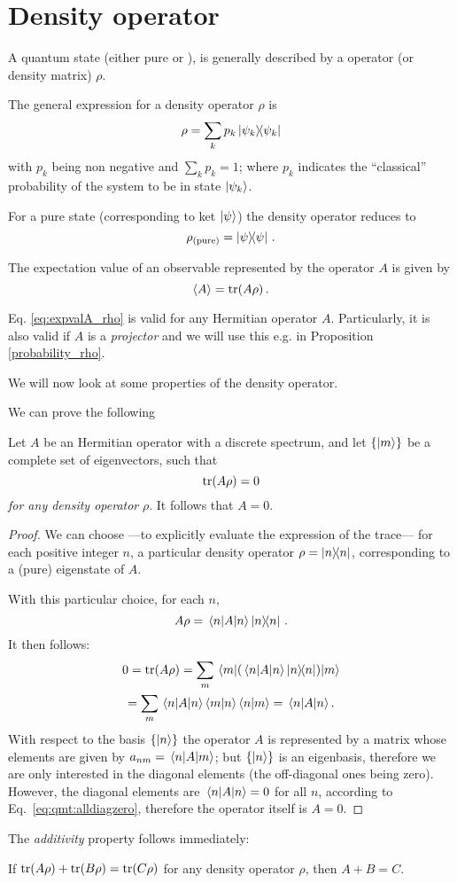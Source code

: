 \section{Density operator}\label{app:density}

A quantum state (either pure or ),
is generally described by a  operator (or density matrix) $\rho$.

The general expression for a density operator $\rho$ is
$$
  \rho = \sum_{k}p_{k}\ketbra{\psi_{k}}
$$
with $p_{k}$ being non negative and $\sum_{k}p_{k} = 1$;
where $p_k$ indicates the ``classical'' probability of the system to be in state $\ket{\psi_{k}}$.

For a pure state (corresponding to ket $\ket{\psi}$) the density operator reduces to
\[
  \rho_{(\text{pure})} = \ketbra{\psi}\,\text{.}
\]

The expectation value of an observable represented by the operator $A$
is given by \parencite{BlumDensity, FanoDensity}
\begin{equation}\label{eq:expvalA_rho}
  \expval{A} = \tr(A\rho)\,.
\end{equation}

Eq. \eqref{eq:expvalA_rho} is valid for any Hermitian operator $A$. Particularly,
it is also valid if $A$ is a \emph{projector} and we will use this
e.g. in Proposition \ref{probability_rho}.

We will now look at some properties of the density operator.

We can prove the following
\begin{proposition}
  Let $A$ be an Hermitian operator
  with a discrete spectrum,
  and let $\{\ket{m}\}$ be
  a complete set of eigenvectors,
  such that
  $$
    \tr(A\rho) = 0
  $$
  \emph{for any density operator} $\rho$.
  It follows that $A = 0$.

  \begin{proof}
    We can choose
    ---to explicitly evaluate the expression of the trace---
    for each positive integer $n$,
    a particular density operator $\rho = \ketbra{n}$,
    corresponding to a (pure) eigenstate of $A$.

    With this particular choice,
    for each $n$,
    $$
      A\rho = \mel{n}{A}{n}\ketbra{n}\,.
    $$
    It then follows:
    \begin{multline}\label{eq:qmt:alldiagzero}
      0 = \tr(A\rho) =  \sum_{m}  \mel{m}{ ( \mel{n}{A}{n}\ketbra{n} ) }{m} \\
        =               \sum_{m}  \mel{n}{A}{n} \braket{m}{n} \braket{n}{m}
        = \mel{n}{A}{n} .
    \end{multline}
    With respect to the basis $\left\{\ket{n}\right\}$ the operator $A$ is
    represented by a matrix whose elements are given by $a_{nm} = \mel{n}{A}{m}$;
    but $\left\{\ket{n}\right\}$ is an eigenbasis, therefore we are only interested in the diagonal
    elements (the off-diagonal ones being zero).
    However, the diagonal elements are  $\mel{n}{A}{n} = 0$
    for all $n$, according to Eq.~\eqref{eq:qmt:alldiagzero}, therefore the operator itself is $A=0$.
  \end{proof}
\end{proposition}

The \emph{additivity} property follows immediately:

\begin{corollary}
If $\tr(A\rho) + \tr(B\rho) = \tr(C\rho)$ for any density operator $\rho$,
then $A + B = C$.
\end{corollary}
